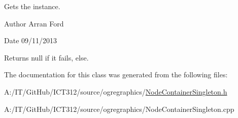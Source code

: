 Gets the instance. 

\begin{DoxyAuthor}{Author}
Arran Ford 
\end{DoxyAuthor}
\begin{DoxyDate}{Date}
09/11/2013
\end{DoxyDate}
\begin{DoxyReturn}{Returns}
null if it fails, else. 
\end{DoxyReturn}


The documentation for this class was generated from the following files\-:\begin{DoxyCompactItemize}
\item 
A\-:/\-I\-T/\-Git\-Hub/\-I\-C\-T312/source/ogregraphics/\hyperlink{_node_container_singleton_8h}{Node\-Container\-Singleton.\-h}\item 
A\-:/\-I\-T/\-Git\-Hub/\-I\-C\-T312/source/ogregraphics/Node\-Container\-Singleton.\-cpp\end{DoxyCompactItemize}
